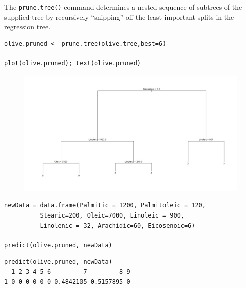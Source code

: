 \documentclass[caret-main.tex]{subfiles}
\begin{document}
The \texttt{prune.tree()} command determines a nested sequence of subtrees of the supplied tree by recursively “snipping” off the least important splits in the regression tree.
\begin{framed}
\begin{verbatim}
olive.pruned <- prune.tree(olive.tree,best=6)

plot(olive.pruned); text(olive.pruned)
\end{verbatim}
\end{framed}
\begin{figure}[h!]
\centering
\includegraphics[width=1.19\linewidth]{./DAquiz6q5b}
\caption{}
\label{fig:DAquiz6q5b}
\end{figure}
\newpage
\begin{framed}
\begin{verbatim}
newData = data.frame(Palmitic = 1200, Palmitoleic = 120, 
          Stearic=200, Oleic=7000, Linoleic = 900, 
          Linolenic = 32, Arachidic=60, Eicosenoic=6)

predict(olive.pruned, newData)
\end{verbatim}
\end{framed}

\begin{verbatim}
predict(olive.pruned, newData)
  1 2 3 4 5 6         7         8 9
1 0 0 0 0 0 0 0.4842105 0.5157895 0
\end{verbatim}
\end{document}
